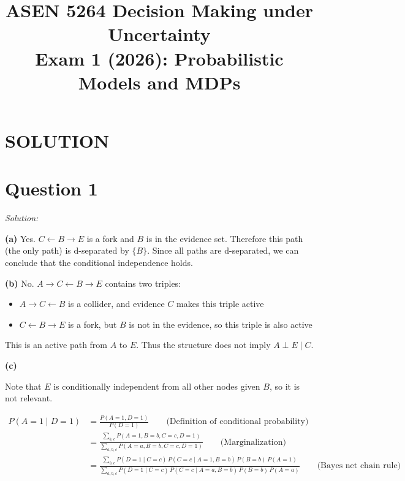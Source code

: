 \documentclass{article}
\title{ASEN 5264 Decision Making under Uncertainty\\
       Exam 1 (2026): Probabilistic Models and MDPs}
\author{}
\theoremstyle{definition}
\newenvironment{solution}{\noindent\textit{Solution:}}{}
\begin{document}
\maketitle

\section*{SOLUTION}


\newpage

\section*{Question 1}

\begin{solution}
    

\textbf{(a)} Yes. $C \leftarrow B \to E$ is a fork and $B$ is in the evidence set. Therefore this path (the only path) is d-separated by $\{B\}$. Since all paths are d-separated, we can conclude that the conditional independence holds.

\textbf{(b)} No. $A \to C \leftarrow B \to E$ contains two triples:
\begin{itemize}
    \item $A \rightarrow C \leftarrow B$ is a collider, and evidence $C$ makes this triple active
    \item $C \leftarrow B \rightarrow E$ is a fork, but $B$ is not in the evidence, so this triple is also active
\end{itemize}
This is an active path from $A$ to $E$. Thus the structure does not imply $A \perp E \mid C$.

\textbf{(c)}

Note that $E$ is conditionally independent from all other nodes given $B$, so it is not relevant.

\begin{align*}
    P(A = 1 \mid D=1) &= \frac{P(A=1, D=1)}{P(D=1)} \qquad \text{(Definition of conditional probability)} \\
                      &= \frac{\sum_{b, c} P(A=1, B=b, C=c, D=1)}{\sum_{a,b,c} P(A=a, B=b, C=c, D=1)} \qquad \text{(Marginalization)} \\
                      &= \frac{\sum_{b,c} P(D=1 \mid C=c) \, P(C=c \mid A=1, B=b) \, P(B=b) \, P(A=1)}{\sum_{a, b, c} P(D=1 \mid C=c) \, P(C=c \mid A=a, B=b) \, P(B=b) \, P(A=a)} \qquad \text{(Bayes net chain rule)}
\end{align*}


\end{solution}
\end{document}
